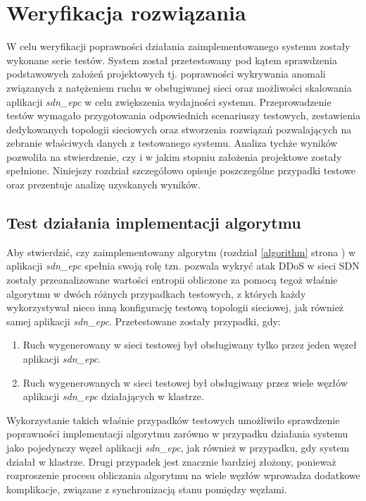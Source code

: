 \chapter{Weryfikacja rozwiązania}

W celu weryfikacji poprawności działania zaimplementowanego systemu zostały
wykonane serie testów. System został przetestowany pod kątem sprawdzenia
podstawowych założeń projektowych tj. poprawności wykrywania anomali związanych
z natężeniem ruchu w obsługiwanej sieci oraz możliwości skalowania
aplikacji \textit{sdn\_epc} w celu zwiększenia wydajności systemu.
Przeprowadzenie testów wymagało przygotowania odpowiednich scenariuszy testowych,
zestawienia dedykowanych topologii sieciowych oraz stworzenia rozwiązań
pozwalających na zebranie właściwych danych z testowanego systemu. Analiza
tychże wyników pozwoliła na stwierdzenie, czy i w jakim stopniu założenia
projektowe zostały spełnione. Niniejszy rozdział szczegółowo opisuje
poszczególne przypadki testowe oraz prezentuje analizę uzyskanych wyników.

\section{Test działania implementacji algorytmu}

Aby stwierdzić, czy zaimplementowany algorytm (rozdział \ref{algorithm} strona
\pageref{algorithm}) w aplikacji \textit{sdn\_epc} spełnia swoją rolę tzn.
pozwala wykryć atak DDoS w sieci SDN zostały przeanalizowane wartości entropii
obliczone za pomocą tegoż właśnie algorytmu w dwóch różnych przypadkach
testowych, z których każdy wykorzystywał nieco inną konfigurację testową
topologii sieciowej, jak również samej aplikacji \textit{sdn\_epc}.
Przetestowane zostały przypadki, gdy:
\begin{enumerate}
  \item Ruch wygenerowany w sieci testowej był obsługiwany tylko przez jeden
    węzeł aplikacji \textit{sdn\_epc}.
  \item Ruch wygenerowanych w sieci testowej był obsługiwany przez wiele węzłów
    aplikacji \textit{sdn\_epc} działających w klastrze.
\end{enumerate}
Wykorzystanie takich właśnie przypadków testowych umożliwiło sprawdzenie
poprawności implementacji algorytmu zarówno w przypadku działania systemu jako
pojedynczy węzeł aplikacji \textit{sdn\_epc}, jak również w przypadku, gdy
system działał w klastrze. Drugi przypadek jest znacznie bardziej złożony,
ponieważ rozproszenie procesu obliczania algorytmu na wiele węzłów wprowadza
dodatkowe komplikacje, związane z synchronizacją stanu pomiędzy węzłami.

